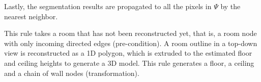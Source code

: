 Lastly, the segmentation results are propagated to all the pixels in $\Psi$
by the nearest neighbor.



 This rule takes a room that has
not been reconstructed yet, that is, a room node with only incoming
directed edges (pre-condition). A room outline in a top-down view is
reconstructed as a 1D polygon, which is extruded to the estimated floor
and ceiling heights to generate a 3D model. This rule generates a floor,
a ceiling and a chain of wall nodes (transformation).
%

